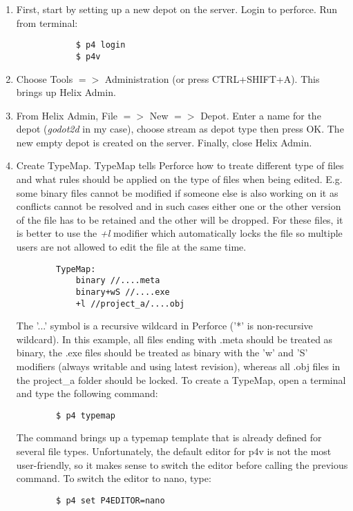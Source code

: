 \begin{enumerate}
    \item First, start by setting up a new depot on the server. Login to perforce. Run from terminal:
        \begin{verbatim}
            $ p4 login
            $ p4v
        \end{verbatim}
    \item Choose Tools {$=>$} Administration (or press CTRL+SHIFT+A). This brings up Helix Admin.
    \item From Helix Admin, File {$=>$} New {$=>$} Depot. Enter a name for the depot (\textit{godot2d} in my case), 
    choose stream as depot type then press \colorbox{blue!30}{OK}. The new empty depot is created on the server. 
    Finally, close Helix Admin.
    \item Create TypeMap. TypeMap tells Perforce how to treate different type of files and what rules should be applied
    on the type of files when being edited. E.g. some binary files cannot be modified if someone else is also working 
    on it as conflicts cannot be resolved and in such cases either one or the other version of the file has to be retained 
    and the other will be dropped. For these files, it is better to use the \textit{+l} modifier which automatically
    locks the file so multiple users are not allowed to edit the file at the same time.
    \begin{verbatim}
        TypeMap:
            binary //....meta
            binary+wS //....exe
            +l //project_a/....obj
    \end{verbatim}
    The '...' symbol is a recursive wildcard in Perforce ('*' is non-recursive wildcard).
    In this example, all files ending with .meta should be treated as binary, the .exe files should be treated as binary
    with the 'w' and 'S' modifiers (always writable and using latest revision), whereas all .obj files in the project\_a
    folder should be locked. To create a TypeMap, open a terminal and type the following command:
    \begin{verbatim}
        $ p4 typemap
    \end{verbatim}
    The command brings up a typemap template that is already defined for several file types. Unfortunately,
    the default editor for p4v is not the most user-friendly, so it makes sense to switch the editor before calling the
    previous command. To switch the editor to nano, type:
    \begin{verbatim}
        $ p4 set P4EDITOR=nano

\end{verbatim}
\end{enumerate}
